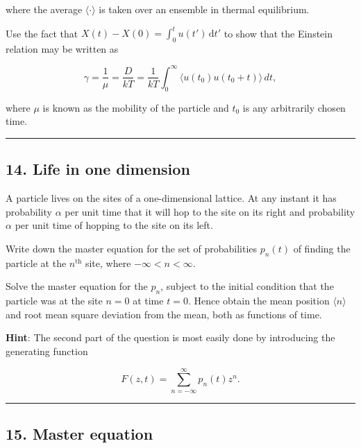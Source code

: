 \documentclass[
  letterpaper,
  enabledeprecatedfontcommands]{report}
\begin{document}
where the average \(\langle \cdot \rangle\) is taken over an ensemble in
thermal equilibrium.

Use the fact that \(X(t) - X(0)
= \int_{0}^{t} u(t')\,\mathrm{d}t'\) to show that the Einstein relation
may be written as

\[
\gamma = \frac{1}{\mu} = \frac{D}{kT} = \frac{1}{kT} \int_0^\infty \langle u(t_0) u(t_0 + t) \rangle \, dt,
\]

where \(\mu\) is known as the mobility of the particle and \(t_0\) is
any arbitrarily chosen time.

\begin{center}\rule{0.5\linewidth}{0.5pt}\end{center}

\subsection*{14. Life in one dimension}\label{life-in-one-dimension}

A particle lives on the sites of a one-dimensional lattice. At any
instant it has probability \(\alpha\) per unit time that it will hop to
the site on its right and probability \(\alpha\) per unit time of
hopping to the site on its left.

Write down the master equation for the set of probabilities \(p_n(t)\)
of finding the particle at the \(n^{\text{th}}\) site, where
\(-\infty < n < \infty\).

Solve the master equation for the \(p_n\), subject to the initial
condition that the particle was at the site \(n = 0\) at time \(t = 0\).
Hence obtain the mean position \(\langle n \rangle\) and root mean
square deviation from the mean, both as functions of time.

\textbf{Hint}: The second part of the question is most easily done by
introducing the generating function

\[
F(z, t) = \sum_{n=-\infty}^{\infty} p_n(t) z^n.
\]

\begin{center}\rule{0.5\linewidth}{0.5pt}\end{center}

\subsection*{15. Master equation}\label{master-equation}
\end{document}
